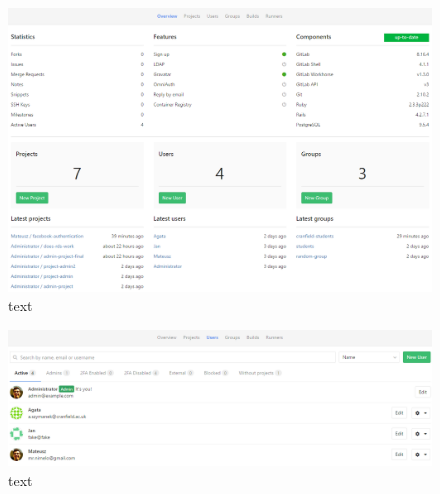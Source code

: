	\begin{figure}[!htbp]
		\centering
		\includegraphics[width=1\textwidth]{img/ug-administartion/overview}
		\caption{text}
		\label{key}
	\end{figure}

	\begin{figure}[!htbp]
		\centering
		\includegraphics[width=1\textwidth]{img/ug-administartion/users}
		\caption{text}
		\label{key}
	\end{figure}